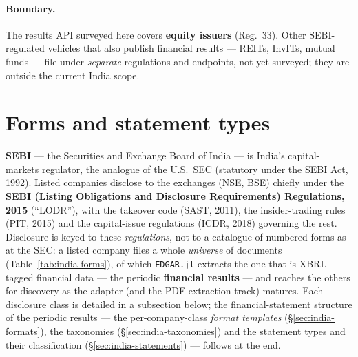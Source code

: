 \documentclass[11pt,a4paper]{report}
\begin{document}
\paragraph{Boundary.} The results API surveyed here covers \textbf{equity issuers} (Reg.~33). Other
SEBI-regulated vehicles that also publish financial results --- REITs, InvITs, mutual funds --- file under
\emph{separate} regulations and endpoints, not yet surveyed; they are outside the current India scope.

\section{Forms and statement types}\label{sec:india-forms}

\textbf{SEBI} --- the Securities and Exchange Board of India --- is India's capital-markets regulator, the
analogue of the U.S.\ SEC (statutory under the SEBI Act, 1992). Listed companies disclose to the exchanges
(NSE, BSE) chiefly under the \textbf{SEBI (Listing Obligations and Disclosure Requirements) Regulations,
2015} (``LODR''), with the takeover code (SAST, 2011), the insider-trading rules (PIT, 2015) and the
capital-issue regulations (ICDR, 2018) governing the rest. Disclosure is keyed to these \emph{regulations},
not to a catalogue of numbered forms as at the SEC: a listed company files a whole \emph{universe} of
documents (Table~\ref{tab:india-forms}), of which \texttt{EDGAR.jl} extracts the one that is XBRL-tagged
financial data --- the periodic \textbf{financial results} --- and reaches the others for discovery as the
adapter (and the PDF-extraction track) matures. Each disclosure class is detailed in a subsection below; the
financial-statement structure of the periodic results --- the per-company-class \emph{format templates}
(\S\ref{sec:india-formats}), the taxonomies (\S\ref{sec:india-taxonomies}) and the statement types and their
classification (\S\ref{sec:india-statements}) --- follows at the end.
\end{document}
